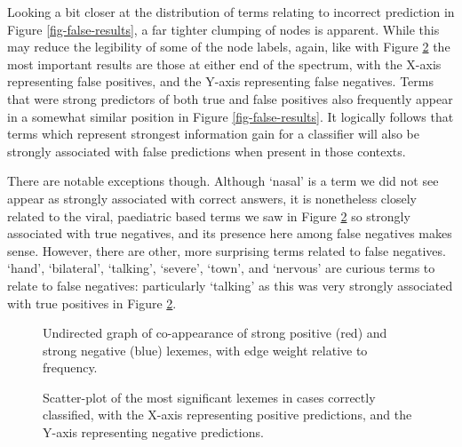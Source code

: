Looking a bit closer at the distribution of terms relating to incorrect prediction in Figure \ref{fig-false-results}, a far tighter clumping of nodes is apparent. While this may reduce the legibility of some of the node labels, again, like with Figure \ref{fig-true-results} the most important results are those at either end of the spectrum, with the X-axis representing false positives, and the Y-axis representing false negatives. Terms that were strong predictors of both true and false positives also frequently appear in a somewhat similar position in Figure \ref{fig-false-results}. It logically follows that terms which represent strongest information gain for a classifier will also be strongly associated with false predictions when present in those contexts.

There are notable exceptions though. Although `nasal' is a term we did not see appear as strongly associated with correct answers, it is nonetheless closely related to the viral, paediatric based terms we saw in Figure \ref{fig-true-results} so strongly associated with true negatives, and its presence here among false negatives makes sense. However, there are other, more surprising terms related to false negatives. `hand', `bilateral', `talking', `severe', `town', and `nervous' are curious terms to relate to false negatives: particularly `talking' as this was very strongly associated with true positives in  Figure \ref{fig-true-results}.   


   \begin{figure}[thpb]
   
      \centering
      \caption{Undirected graph of co-appearance of strong positive (red) and strong negative (blue) lexemes, with edge weight relative to frequency.}
      \label{fig-top-network}
   \end{figure}


\begin{landscape}
   \begin{figure}[thpb]
   
      \centering
      \caption{Scatter-plot of the most significant lexemes in cases correctly classified, with the X-axis representing positive predictions, and the Y-axis representing negative predictions.}
      \label{fig-true-results}
   \end{figure}
\end{landscape}   
   

